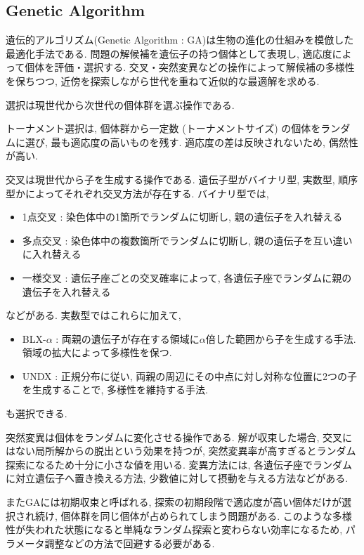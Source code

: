 \changeindent{0cm}
\subsection{Genetic Algorithm}
\changeindent{2cm}
\label{sec:02_ga}
遺伝的アルゴリズム(Genetic Algorithm : GA)は生物の進化の仕組みを模倣した最適化手法である.
問題の解候補を遺伝子の持つ個体として表現し, 適応度によって個体を評価・選択する.
交叉・突然変異などの操作によって解候補の多様性を保ちつつ,
近傍を探索しながら世代を重ねて近似的な最適解を求める.

選択は現世代から次世代の個体群を選ぶ操作である.

トーナメント選択は, 個体群から一定数 (トーナメントサイズ) の個体をランダムに選び, 最も適応度の高いものを残す.
適応度の差は反映されないため, 偶然性が高い.


交叉は現世代から子を生成する操作である.
遺伝子型がバイナリ型, 実数型, 順序型かによってそれぞれ交叉方法が存在する.
バイナリ型では,
\begin{itemize}
  \item 1点交叉 : 染色体中の1箇所でランダムに切断し, 親の遺伝子を入れ替える
  \item 多点交叉 : 染色体中の複数箇所でランダムに切断し, 親の遺伝子を互い違いに入れ替える
  \item 一様交叉 : 遺伝子座ごとの交叉確率によって, 各遺伝子座でランダムに親の遺伝子を入れ替える
\end{itemize}
などがある.
実数型ではこれらに加えて,
\begin{itemize}
  \item BLX-$\alpha$ : 両親の遺伝子が存在する領域に$\alpha$倍した範囲から子を生成する手法. 領域の拡大によって多様性を保つ.
  \item UNDX : 正規分布に従い, 両親の周辺にその中点に対し対称な位置に2つの子を生成することで, 多様性を維持する手法.
\end{itemize}
も選択できる.

突然変異は個体をランダムに変化させる操作である.
解が収束した場合, 交叉にはない局所解からの脱出という効果を持つが,
突然変異率が高すぎるとランダム探索になるため十分に小さな値を用いる.
変異方法には, 各遺伝子座でランダムに対立遺伝子へ置き換える方法, 少数値に対して摂動を与える方法などがある.

またGAには初期収束と呼ばれる, 探索の初期段階で適応度が高い個体だけが選択され続け,
個体群を同じ個体が占められてしまう問題がある.
このような多様性が失われた状態になると単純なランダム探索と変わらない効率になるため,
パラメータ調整などの方法で回避する必要がある.


